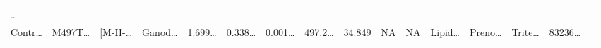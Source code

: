 \documentclass[
]{article}
\begin{document}
\begin{longtable}[]{@{}llllllllllllllll@{}}
\begin{minipage}[t]{0.02\columnwidth}
\ldots{}\strut
\end{minipage}\tabularnewline
\begin{minipage}[t]{0.04\columnwidth}\raggedright
Contr\ldots{}\strut
\end{minipage} & \begin{minipage}[t]{0.04\columnwidth}\raggedright
M497T\ldots{}\strut
\end{minipage} & \begin{minipage}[t]{0.04\columnwidth}\raggedright
{[}M-H-\ldots{}\strut
\end{minipage} & \begin{minipage}[t]{0.04\columnwidth}\raggedright
Ganod\ldots{}\strut
\end{minipage} & \begin{minipage}[t]{0.04\columnwidth}\raggedright
1.699\ldots{}\strut
\end{minipage} & \begin{minipage}[t]{0.04\columnwidth}\raggedright
0.338\ldots{}\strut
\end{minipage} & \begin{minipage}[t]{0.04\columnwidth}\raggedright
0.001\ldots{}\strut
\end{minipage} & \begin{minipage}[t]{0.04\columnwidth}\raggedright
497.2\ldots{}\strut
\end{minipage} & \begin{minipage}[t]{0.04\columnwidth}\raggedright
34.849\strut
\end{minipage} & \begin{minipage}[t]{0.04\columnwidth}\raggedright
NA\strut
\end{minipage} & \begin{minipage}[t]{0.03\columnwidth}\raggedright
NA\strut
\end{minipage} & \begin{minipage}[t]{0.04\columnwidth}\raggedright
Lipid\ldots{}\strut
\end{minipage} & \begin{minipage}[t]{0.04\columnwidth}\raggedright
Preno\ldots{}\strut
\end{minipage} & \begin{minipage}[t]{0.04\columnwidth}\raggedright
Trite\ldots{}\strut
\end{minipage} & \begin{minipage}[t]{0.04\columnwidth}\raggedright
83236\ldots{}\strut
\end{minipage} & \begin{minipage}[t]{0.02\columnwidth}\raggedright

\end{minipage}
\end{longtable}
\end{document}
